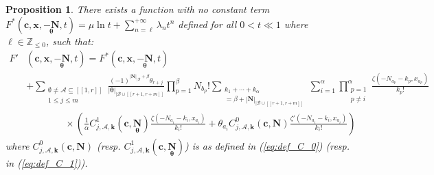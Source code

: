 \documentclass[a4paper]{amsart}
\newtheorem{proposition}[theorem]{Proposition}
\theoremstyle{remark}
\theoremstyle{definition}
\begin{document}
\begin{proposition}
\label{prop:formule_F_prime}
There exists a function with no constant term $F^*(\mathbf{c},\mathbf{x},\underset{\bm{\theta}}{-\mathbf{N}},t) = \mu \ln t + \sum_{n=\ell}^{+\infty} \lambda_n t^{n}$ defined for all $0 < t \ll 1$ where $\ell \in \mathbb{Z}_{\leq 0}$, such that:
\begin{align}
    F'&(\mathbf{c},\mathbf{x},\underset{\bm{\theta}}{-\mathbf{N}},t) = F^*(\mathbf{c},\mathbf{x},\underset{\bm{\theta}}{-\mathbf{N}},t) \label{eq:directional_derivative_formula_F_s0} \\
    & +\sum_{\substack{\emptyset \neq \mathcal{A} \subseteq [\![1,r]\!] \\ 1 \leq j \leq m}} \frac{(-1)^{|\mathbf{N}|_{|\mathcal{B}}+ \beta}\theta_{r+j}}{|\bm{\theta}|_{|\mathcal{B}\cup[\![r+1,r+m]\!]}} \prod_{p=1}^{\beta} N_{b_p}! \sum_{\substack{k_1+\cdots+k_{\alpha} \\ = \beta + |\mathbf{N}|_{|\mathcal{B}\cup [\![ r+1,r+m ]\!]}}} \sum_{i=1}^{\alpha} \prod_{\substack{p=1 \\ p \neq i}}^{\alpha} \frac{\zeta(-N_{a_p}-k_p,x_{a_p})}{k_p!} \nonumber \\
    & \qquad \qquad \times \left(\frac{1}{\alpha} C^1_{j,\mathcal{A},\mathbf{k}}(\mathbf{c},\underset{\bm{\theta}}{\mathbf{N}}) \frac{\zeta(-N_{a_i}-k_i,x_{a_i})}{k_i!} + \theta_{a_i} C^0_{j,\mathcal{A},\mathbf{k}}(\mathbf{c},\mathbf{N}) \frac{\zeta'(-N_{a_i}-k_i,x_{a_i})}{k_i!} \right) \nonumber
\end{align}
where $C^0_{j,\mathcal{A},\mathbf{k}}(\mathbf{c},\mathbf{N})$ (resp. $C^1_{j,\mathcal{A},\mathbf{k}}(\mathbf{c},\underset{\bm{\theta}}{\mathbf{N}})$) is as defined in (\ref{eq:def_C_0}) (resp. in (\ref{eq:def_C_1})).
\end{proposition}
\end{document}
